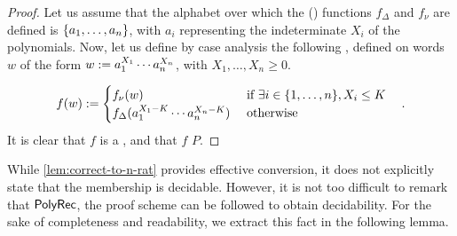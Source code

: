 \begin{proof}
    Let us assume that the alphabet over which the () functions
    $f_\Delta$ and $f_\nu$ are defined is $\mathopen{\{} a_1, \dots, a_n \mathclose{\}}$, with $a_i$
    representing the indeterminate $X_i$ of the polynomials. Now, let us define
    by case analysis the following  , defined on words $w$ of the form $w \mathrel{:=}
    a_1^{X_1} \cdots a_n^{X_n}$, with $X_1, \dots, X_n \geq 0$.

    \begin{equation*}
        f(w) \mathrel{:=}
        \begin{cases}
            f_\nu(w) & \text{ if } \exists i \in \mathopen{\{} 1, \dots, n \mathclose{\}}, X_i \leq K \\
            f_\Delta(a_1^{X_1 - K} \cdots a_n^{X_n - K}) & \text{ otherwise }
        \end{cases}
        \quad .
    \end{equation*}
    It is clear that
    $f$ is a  ,
    and that
    $f$  $P$.
\end{proof}

While \cref{lem:correct-to-n-rat} provides effective conversion, it does not
explicitly state that the membership is decidable. However, it is not too
difficult to remark that $\mathsf{PolyRec}$, the proof scheme can be followed to
obtain decidability. For the sake of completeness and readability,
we extract this fact in the following lemma.

